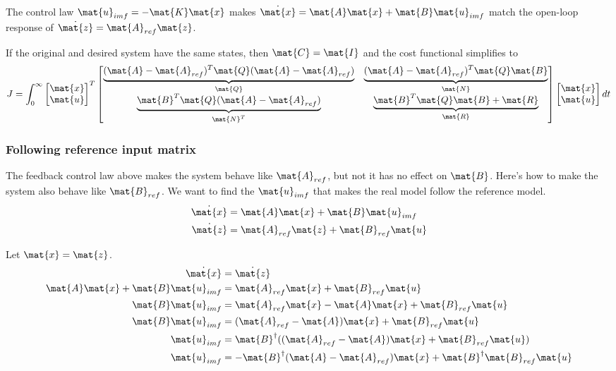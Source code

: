 The control law $\mat{u}_{imf} = -\mat{K}\mat{x}$ makes
$\dot{\mat{x}} = \mat{A}\mat{x} + \mat{B}\mat{u}_{imf}$ match the open-loop
response of $\dot{\mat{z}} = \mat{A}_{ref}\mat{z}$.

If the original and desired system have the same states, then
$\mat{C} = \mat{I}$ and the cost functional simplifies to
\begin{equation}
  J = \int_0^\infty
  \begin{bmatrix}
    \mat{x} \\
    \mat{u}
  \end{bmatrix}^T
  \begin{bmatrix}
    \underbrace{(\mat{A} - \mat{A}_{ref})^T\mat{Q}
      (\mat{A} - \mat{A}_{ref})}_{\mat{Q}} &
    \underbrace{(\mat{A} - \mat{A}_{ref})^T\mat{Q}\mat{B}}_{\mat{N}} \\
    \underbrace{\mat{B}^T\mat{Q}(\mat{A} - \mat{A}_{ref})}_{\mat{N}^T} &
    \underbrace{\mat{B}^T\mat{Q}\mat{B} + \mat{R}}_{\mat{R}}
  \end{bmatrix}
  \begin{bmatrix}
    \mat{x} \\
    \mat{u}
  \end{bmatrix}
  dt
\end{equation}

\subsubsection{Following reference input matrix}

The feedback control law above makes the system behave like $\mat{A}_{ref}$, but
not it has no effect on $\mat{B}$. Here's how to make the system also behave
like $\mat{B}_{ref}$. We want to find the $\mat{u}_{imf}$ that makes the real
model follow the reference model.
\begin{align*}
  \dot{\mat{x}} &= \mat{A}\mat{x} + \mat{B}\mat{u}_{imf} \\
  \dot{\mat{z}} &= \mat{A}_{ref}\mat{z} + \mat{B}_{ref}\mat{u}
\end{align*}

Let $\mat{x} = \mat{z}$.
\begin{align*}
  \dot{\mat{x}} &= \dot{\mat{z}} \\
  \mat{A}\mat{x} + \mat{B}\mat{u}_{imf} &= \mat{A}_{ref}\mat{x} +
    \mat{B}_{ref}\mat{u} \\
  \mat{B}\mat{u}_{imf} &= \mat{A}_{ref}\mat{x} - \mat{A}\mat{x} +
    \mat{B}_{ref}\mat{u} \\
  \mat{B}\mat{u}_{imf} &= (\mat{A}_{ref} - \mat{A})\mat{x} +
    \mat{B}_{ref}\mat{u} \\
  \mat{u}_{imf} &= \mat{B}^\dagger ((\mat{A}_{ref} - \mat{A})\mat{x} +
    \mat{B}_{ref}\mat{u}) \\
  \mat{u}_{imf} &= -\mat{B}^\dagger (\mat{A} - \mat{A}_{ref})\mat{x} +
    \mat{B}^\dagger \mat{B}_{ref}\mat{u}
\end{align*}

